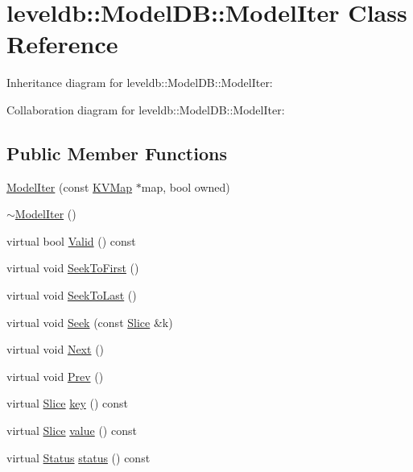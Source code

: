 \hypertarget{classleveldb_1_1_model_d_b_1_1_model_iter}{\section{leveldb\-:\-:Model\-D\-B\-:\-:Model\-Iter Class Reference}
\label{classleveldb_1_1_model_d_b_1_1_model_iter}
}


Inheritance diagram for leveldb\-:\-:Model\-D\-B\-:\-:Model\-Iter\-:


Collaboration diagram for leveldb\-:\-:Model\-D\-B\-:\-:Model\-Iter\-:
\subsection*{Public Member Functions}
\begin{DoxyCompactItemize}
\item 
\hyperlink{classleveldb_1_1_model_d_b_1_1_model_iter_a8ce3cac545f29fd55cbc0328bf3dbe26}{Model\-Iter} (const \hyperlink{namespaceleveldb_aac1e50450147be263e08252c6700f7a7}{K\-V\-Map} $\ast$map, bool owned)
\item 
\hyperlink{classleveldb_1_1_model_d_b_1_1_model_iter_a3920ed0781aebe21dfccef855ff31946}{$\sim$\-Model\-Iter} ()
\item 
virtual bool \hyperlink{classleveldb_1_1_model_d_b_1_1_model_iter_a645d712995a2926a2699a6274fdd8c96}{Valid} () const 
\item 
virtual void \hyperlink{classleveldb_1_1_model_d_b_1_1_model_iter_ac3f3118f2aa6df676e40ad848929965f}{Seek\-To\-First} ()
\item 
virtual void \hyperlink{classleveldb_1_1_model_d_b_1_1_model_iter_a73f54e91a379f3584aaa1ad99f435c5f}{Seek\-To\-Last} ()
\item 
virtual void \hyperlink{classleveldb_1_1_model_d_b_1_1_model_iter_ab581a60c36582a06a835bcaf766dc124}{Seek} (const \hyperlink{classleveldb_1_1_slice}{Slice} \&k)
\item 
virtual void \hyperlink{classleveldb_1_1_model_d_b_1_1_model_iter_ae6c95ecf39787bc465ac7482fe7cf6fa}{Next} ()
\item 
virtual void \hyperlink{classleveldb_1_1_model_d_b_1_1_model_iter_acf667aa8d5e11d6acc16134959e43c40}{Prev} ()
\item 
virtual \hyperlink{classleveldb_1_1_slice}{Slice} \hyperlink{classleveldb_1_1_model_d_b_1_1_model_iter_a53ff9e91d51bc5bcab4585758a103749}{key} () const 
\item 
virtual \hyperlink{classleveldb_1_1_slice}{Slice} \hyperlink{classleveldb_1_1_model_d_b_1_1_model_iter_ad18eafbd733612fbe9f002b56334d871}{value} () const 
\item 
virtual \hyperlink{classleveldb_1_1_status}{Status} \hyperlink{classleveldb_1_1_model_d_b_1_1_model_iter_a4798d61aefbd89c93ca7ac753b695a11}{status} () const 
\end{DoxyCompactItemize}
